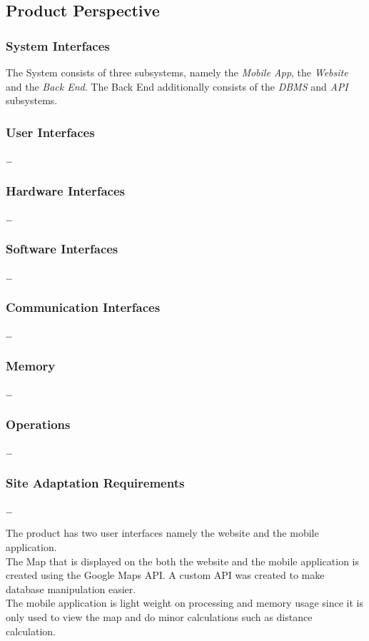 \documentclass{article}
\begin{document}
    \subsection{Product Perspective}

    \subsubsection{System Interfaces}
    The System consists of three subsystems, namely the \textit{Mobile App},
    the \textit{Website} and the \textit{Back End}. The Back End additionally
    consists of the \textit{DBMS} and \textit{API} subsystems.

    \subsubsection{User Interfaces}
    \ldots

    \subsubsection{Hardware Interfaces}
    \ldots

    \subsubsection{Software Interfaces}
    \ldots

    \subsubsection{Communication Interfaces}
    \ldots

    \subsubsection{Memory}
    \ldots

    \subsubsection{Operations}
    \ldots

    \subsubsection{Site Adaptation Requirements}
    \ldots

    The product has two user interfaces namely the website and the mobile
    application.\\ The Map that is displayed on the both the website and the
    mobile application is created using the Google Maps API. A custom API was
    created to make database manipulation easier.\\ The mobile application is
    light weight on processing and memory usage since it is only used to view
    the map and do minor calculations such as distance calculation.
\end{document}

